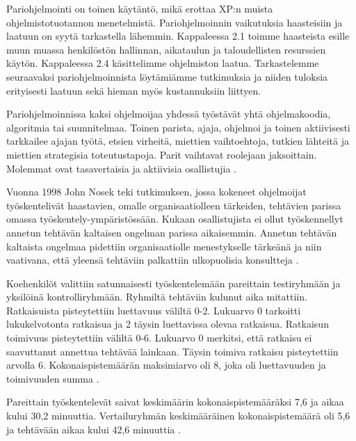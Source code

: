 \documentclass[finnish]{tktltiki2}
\theoremstyle{definition}
\theoremstyle{remark}
\begin{document}
Pariohjelmointi on toinen käytäntö, mikä erottaa XP:n muista ohjelmistotuotannon menetelmistä. Pariohjelmoinnin vaikutuksia haasteisiin ja laatuun on syytä tarkastella lähemmin. Kappaleessa 2.1 toimme haasteista esille muun muassa henkilöstön hallinnan, aikataulun ja taloudellisten resurssien käytön. Kappaleessa 2.4 käsittelimme ohjelmiston laatua. Tarkastelemme seuraavaksi pariohjelmoinnista löytämiämme tutkimuksia ja niiden tuloksia erityisesti laatuun sekä hieman myös kustannuksiin liittyen.

Pariohjelmoinnissa kaksi ohjelmoijaa yhdessä työstävät yhtä ohjelmakoodia, algoritmia tai suunnitelmaa. Toinen parista, ajaja, ohjelmoi ja toinen aktiivisesti tarkkailee ajajan työtä, etsien virheitä, miettien vaihtoehtoja, tutkien lähteitä ja miettien strategisia toteutustapoja. Parit vaihtavat roolejaan jaksoittain. Molemmat ovat tasavertaisia ja aktiivisia osallistujia \cite{WIL00}.

Vuonna 1998 John Nosek teki tutkimuksen, jossa kokeneet ohjelmoijat työskentelivät haastavien, omalle organisaatiolleen tärkeiden, tehtävien parissa omassa työskentely-ympäristössään. Kukaan osallistujista ei ollut työskennellyt annetun tehtävän kaltaisen ongelman parissa aikaisemmin. Annetun tehtävän kaltaista ongelmaa pidettiin organisaatiolle menestykselle tärkeänä ja niin vaativana, että yleensä tehtäviin palkattiin ulkopuolisia konsultteja \cite{NOS98}.

Koehenkilöt valittiin satunnaisesti työskentelemään pareittain testiryhmään ja yksilöinä kontrolliryhmään.
Ryhmiltä tehtäviin kulunut aika mitattiin. Ratkaisuista pisteytettiin luettavuus väliltä 0-2. Lukuarvo 0 tarkoitti lukukelvotonta ratkaisua ja 2 täysin luettavissa olevaa ratkaisua. Ratkaisun toimivuus pisteytettiin väliltä 0-6. Lukuarvo 0 merkitsi, että ratkaisu ei saavuttanut annettua tehtävää lainkaan. Täysin toimiva ratkaisu pisteytettiin arvolla 6. Kokonaispistemäärän maksimiarvo oli 8, joka oli luettavuuden ja toimivuuden summa \cite{NOS98}.

Pareittain työskentelevät saivat keskimäärin kokonaispistemääräksi 7,6 ja aikaa kului 30,2 minuuttia. Vertailuryhmän keskimääräinen kokonaispistemäärä oli 5,6 ja tehtävään aikaa kului 42,6 minuuttia \cite{NOS98}.
\end{document}
